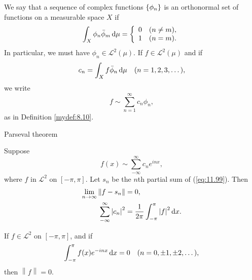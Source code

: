 \begin{mydef}
    \label{mydef:11.39}
    We say that a sequence of complex functions $\protect\{\phi_n\}$ is an
    orthonormal set of functions on a measurable space $X$ if
    \begin{equation*}
        \int_X \phi_n \bar{\phi}_m \d \mu =
        \left\{
        \begin{array}{ll}
            0 & (n \neq m), \\
            1 & (n =    m). \\
        \end{array}
        \right.
    \end{equation*}
    In particular, we must have $\phi_n \in \mathscr{L}^2(\mu)$.
    If $f \in \mathscr{L}^2(\mu)$ and if
    \begin{equation*}
        c_n = \int_X f \bar{\phi}_n \d \mu
        \quad (n = 1,2,3,\dots),
    \end{equation*}
    we write
    \begin{equation*}
        f \sim \sum_{n=1}^{\infty} c_n \phi_n ,
    \end{equation*}
    as in Definition \ref{mydef:8.10}.
\end{mydef}


Parseval theorem
\begin{thm}
    \label{thm:11.40}
    Suppose
    \begin{equation}
        \label{eq:11.99}
        f(x) \sim \sum_{-\infty}^{\infty} c_n e^{inx} ,
    \end{equation}
    where $f$ in $\mathscr{L}^2$ on $[-\pi, \pi]$.
    Let $s_n$ be the $n$th partial sum of (\ref{eq:11.99}).
    Then
    \begin{align}
        \label{eq:11.100}
        \lim_{n \to \infty} \left\| f - s_n \right\| & = 0, \\
        \label{eq:11.101}
        \sum_{-\infty}^{\infty} \left| c_n \right|^2 & =
        \frac{1}{2\pi} \int_{-\pi}^{\pi} \left| f \right|^2 \d x.
    \end{align}
\end{thm}

\begin{myCorollary*}
    If $f \in \mathscr{L}^2$ on $[-\pi, \pi]$, and if
    \begin{equation*}
        \int_{-\pi}^{\pi} f(x) e^{-inx} \d x = 0
        \quad (n = 0, \pm 1, \pm 2, \dots),
    \end{equation*}
    then $\left\| f \right\| = 0$.
\end{myCorollary*}

